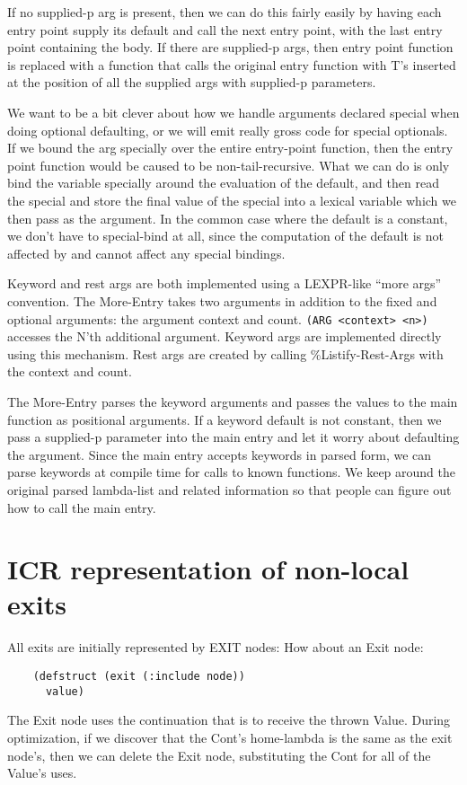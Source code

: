 If no supplied-p arg is present, then we can do this fairly easily by having
each entry point supply its default and call the next entry point, with the
last entry point containing the body.  If there are supplied-p args, then entry
point function is replaced with a function that calls the original entry
function with T's inserted at the position of all the supplied args with
supplied-p parameters.

We want to be a bit clever about how we handle arguments declared special when
doing optional defaulting, or we will emit really gross code for special
optionals.  If we bound the arg specially over the entire entry-point function,
then the entry point function would be caused to be non-tail-recursive.  What
we can do is only bind the variable specially around the evaluation of the
default, and then read the special and store the final value of the special
into a lexical variable which we then pass as the argument.  In the common case
where the default is a constant, we don't have to special-bind at all, since
the computation of the default is not affected by and cannot affect any special
bindings.

Keyword and rest args are both implemented using a LEXPR-like ``more
args'' convention.  The More-Entry takes two arguments in addition to
the fixed and optional arguments: the argument context and count.
\verb+(ARG <context> <n>)+ accesses the N'th additional argument.  Keyword
args are implemented directly using this mechanism.  Rest args are
created by calling \%Listify-Rest-Args with the context and count.

The More-Entry parses the keyword arguments and passes the values to the main
function as positional arguments.  If a keyword default is not constant, then
we pass a supplied-p parameter into the main entry and let it worry about
defaulting the argument.  Since the main entry accepts keywords in parsed form,
we can parse keywords at compile time for calls to known functions.  We keep
around the original parsed lambda-list and related information so that people
can figure out how to call the main entry.


\section{ICR representation of non-local exits}

All exits are initially represented by EXIT nodes:
How about an Exit node:
\begin{verbatim}
    (defstruct (exit (:include node))
      value)
\end{verbatim}
The Exit node uses the continuation that is to receive the thrown Value.
During optimization, if we discover that the Cont's home-lambda is the same as
the exit node's, then we can delete the Exit node, substituting the Cont for
all of the Value's uses.

